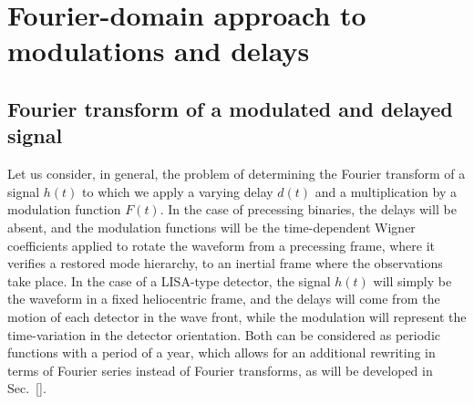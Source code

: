 \documentclass[aps,showpacs,twocolumn,
prd,superscriptaddress,nofootinbib]{revtex4-1}
\begin{document}

\section{Fourier-domain approach to modulations and delays}
\label{sec:formalism}


\subsection{Fourier transform of a modulated and delayed signal}
\label{subsec:FTgeneral}

Let us consider, in general, the problem of determining the Fourier transform of a signal $h(t)$ to which we apply a varying delay $d(t)$ and a multiplication by a modulation function $F(t)$. In the case of precessing binaries, the delays will be absent, and the modulation functions will be the time-dependent Wigner coefficients applied to rotate the waveform from a precessing frame, where it verifies a restored mode hierarchy, to an inertial frame where the observations take place. In the case of a LISA-type detector, the signal $h(t)$ will simply be the waveform in a fixed heliocentric frame, and the delays will come from the motion of each detector in the wave front, while the modulation will represent the time-variation in the detector orientation. Both can be considered as periodic functions with a period of a year, which allows for an additional rewriting in terms of Fourier series instead of Fourier transforms, as will be developed in Sec.~\ref{}. 
\end{document}
